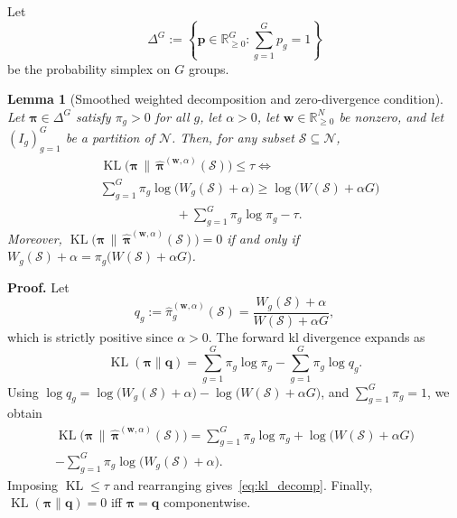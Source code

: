 \documentclass[10pt,journal]{IEEEtran}
\makeatletter
\newcommand{\R}{\mathbb{R}}
\newcommand{\1}{\mathbf{1}}
\newcommand{\bw}{\mathbf{w}}
\newcommand{\bpi}{\boldsymbol{\pi}}
\newcommand{\Sel}{\mathcal{S}}
\DeclareMathOperator{\KL}{KL}
\theoremstyle{ieeethm}
\newtheorem{lemma}{Lemma}
\renewcommand{\IEEEproofname}{Proof}
\renewenvironment{IEEEproof}[1][\IEEEproofname]{%
  \par\pushQED{\IEEEQED}%
  \normalfont
  \topsep6\p@\@plus6\p@\relax
  \trivlist
  \item[]\textbf{#1.}\ignorespaces
}{%
  \popQED\endtrivlist\@endpefalse
}
\makeatother
\begin{document}
Let
\begin{equation*}
\Delta^G:= \left\lbrace \mathbf{p}\in\R_{\ge 0}^{G}:\sum_{g=1}^{G}p_g=1 \right\rbrace
\end{equation*}
be the probability simplex on $G$ groups.

\begin{lemma}[Smoothed weighted  decomposition and zero-divergence condition]
\label{thm:kl_feasibility}
Let $\bpi\in\Delta^G$ satisfy $\pi_g>0$ for all $g$, let $\alpha>0$, let $\bw\in\R_{\ge 0}^N$ be nonzero, and let $(I_g)_{g=1}^G$ be a partition of $\mathcal{N}$. Then, for any subset $\Sel\subseteq\mathcal{N}$,
\begin{equation}
\label{eq:kl_decomp}
\begin{aligned}
&\KL\!\big(\bpi\,\big\|\,\widehat{\bpi}^{(\bw,\alpha)}(\Sel)\big)\le \tau
\iff
\\
&\sum_{g=1}^{G}\pi_g\log\!\big(W_g(\Sel)+\alpha\big)
\ge
\log\!\big(W(\Sel)+\alpha G\big)
\\
&\qquad\qquad\qquad + \sum_{g=1}^{G}\pi_g\log\pi_g - \tau.
\end{aligned}
\end{equation}
Moreover, $\KL\!\big(\bpi\,\big\|\,\widehat{\bpi}^{(\bw,\alpha)}(\Sel)\big)=0$ if and only if $W_g(\Sel)+\alpha
=
\pi_g\big(W(\Sel)+\alpha G\big)$.
\end{lemma}

\begin{IEEEproof}\enspace
Let
\begin{equation*}
q_g:=\widehat{\pi}_g^{(\bw,\alpha)}(\Sel)
=
\frac{W_g(\Sel)+\alpha}{W(\Sel)+\alpha G},
\end{equation*}
which is strictly positive since $\alpha>0$. The forward \gls{kl} divergence expands as
\begin{equation*}
\KL(\bpi\|\mathbf q)
=
\sum_{g=1}^{G}\pi_g\log\pi_g
-
\sum_{g=1}^{G}\pi_g\log q_g.
\end{equation*}
Using $\log q_g
=
\log\!\big(W_g(\Sel)+\alpha\big)
-
\log\!\big(W(\Sel)+\alpha G\big)$,
and $\sum_{g=1}^{G}\pi_g=1$, we obtain
\begin{equation*}
\begin{aligned}
\KL\!\big(\bpi\,\big\|\,\widehat{\bpi}^{(\bw,\alpha)}(\Sel)\big)
=
\sum_{g=1}^{G}\pi_g\log\pi_g
+
\log\!\big(W(\Sel)+\alpha G\big)\\
-
\sum_{g=1}^{G}\pi_g\log\!\big(W_g(\Sel)+\alpha\big).
\end{aligned}
\end{equation*}
Imposing $\KL\le\tau$ and rearranging gives~\eqref{eq:kl_decomp}. Finally,
$\KL(\bpi\|\mathbf q)=0$ iff $\bpi=\mathbf q$ componentwise.
\end{IEEEproof}
\end{document}
